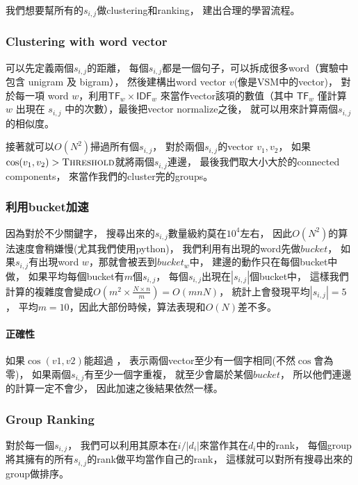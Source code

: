 我們想要幫所有的$s_{i,j}$做clustering和ranking，
建出合理的學習流程。
\subsubsection{Clustering with word vector}

可以先定義兩個$s_{i,j}$的距離，
每個$s_{i,j}$都是一個句子，可以拆成很多word（實驗中包含 unigram 及 bigram），
然後建構出word vector $v$(像是VSM中的vector)，
對於每一項 word $w$，利用$\mathsf{TF}_w\times\mathsf{IDF}_w$
來當作vector該項的數值（其中 $\mathsf{TF}_w$ 僅計算 $w$ 出現在 $s_{i,j}$
中的次數），最後把vector normalize之後，
就可以用來計算兩個$s_{i,j}$的相似度。

接著就可以$O(N^{2})$掃過所有個$s_{i,j}$，
對於兩個$s_{i,j}$的vector $v_1,v_2$，
如果$\cos(v_1,v_2) > \text{\textproc{Threshold}}$就將兩個$s_{i,j}$連邊，
最後我們取大小大於的connected components，
來當作我們的cluster完的groups。

\subsubsection{利用bucket加速}
因為對於不少關鍵字，
搜尋出來的$s_{i,j}$數量級約莫在$10^4$左右，
因此$O(N^{2})$的算法速度會稍嫌慢(尤其我們使用python)，
我們利用有出現的word先做$\mathit{bucket}$，
如果$s_{i,j}$有出現word $w$，那就會被丟到$bucket_w$中，
建邊的動作只在每個bucket中做，
如果平均每個bucket有$m$個$s_{i,j}$，
每個$s_{i,j}$出現在$|s_{i,j}|$個bucket中，
這樣我們計算的複雜度會變成$O(m^2\times \frac{N\times n}{m}) = O(mnN)$，
統計上會發現平均$|s_{i,j}| = 5$，
平均$m = 10$，因此大部份時候，算法表現和$O(N)$差不多。

\noindent \paragraph{正確性}
如果$\cos(v1,v2)$能超過 ，
表示兩個vector至少有一個字相同(不然$\cos$會為零)，
如果兩個$s_{i,j}$有至少一個字重複，
就至少會屬於某個$\mathit{bucket}$，
所以他們連邊的計算一定不會少，
因此加速之後結果依然一樣。

\subsubsection{Group Ranking}
對於每一個$s_{i,j}$，
我們可以利用其原本在$i/|d_i|$來當作其在$d_i$中的rank，
每個group將其擁有的所有$s_{i,j}$的rank做平均當作自己的rank，
這樣就可以對所有搜尋出來的group做排序。

